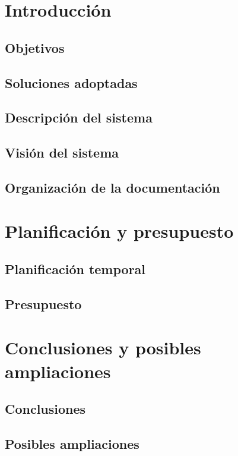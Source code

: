 \section{Introducción}
\subsection{Objetivos}
\subsection{Soluciones adoptadas}
\subsection{Descripción del sistema}
\subsection{Visión del sistema}
\subsection{Organización de la documentación}

\section{Planificación y presupuesto}
\subsection{Planificación temporal}
\subsection{Presupuesto}

\section{Conclusiones y posibles ampliaciones}
\subsection{Conclusiones}
\subsection{Posibles ampliaciones}
